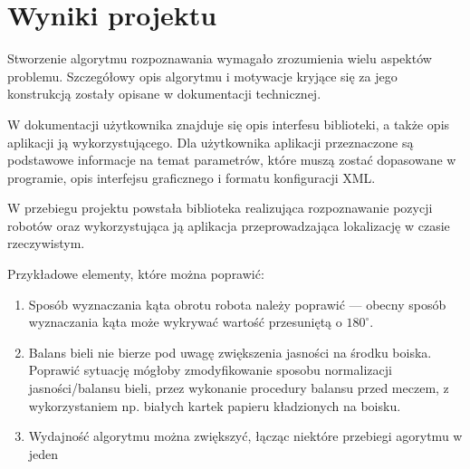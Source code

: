 \documentclass[polish,12pt]{aghthesis}
\begin{document}
\section{Wyniki projektu}

\label{sec:wyniki-projektu}
% 

Stworzenie algorytmu rozpoznawania wymagało
zrozumienia wielu aspektów problemu. Szczegółowy opis algorytmu i motywacje 
kryjące się za jego konstrukcją zostały opisane w dokumentacji technicznej. 

W dokumentacji użytkownika znajduje się opis interfesu biblioteki, a także opis
aplikacji ją wykorzystującego. Dla użytkownika aplikacji przeznaczone są 
podstawowe informacje na temat parametrów, które muszą zostać dopasowane w 
programie, opis interfejsu graficznego i formatu konfiguracji XML.

W przebiegu projektu powstała biblioteka realizująca
rozpoznawanie pozycji robotów oraz wykorzystująca ją aplikacja przeprowadzająca
lokalizację w czasie rzeczywistym. 

Przykładowe elementy, które można poprawić:
\begin{enumerate}
\item Sposób wyznaczania kąta obrotu robota należy poprawić --- obecny
sposób wyznaczania kąta może wykrywać wartość przesuniętą o $180^\circ$.
\item Balans bieli nie bierze pod uwagę zwiększenia jasności na środku boiska.
Poprawić sytuację mógłoby zmodyfikowanie sposobu normalizacji jasności/balansu 
bieli, przez wykonanie procedury balansu przed meczem, z wykorzystaniem np.
białych kartek papieru kładzionych na boisku.
\item Wydajność algorytmu można zwiększyć, łącząc niektóre przebiegi agorytmu
w jeden
\end{enumerate}





\end{document}
